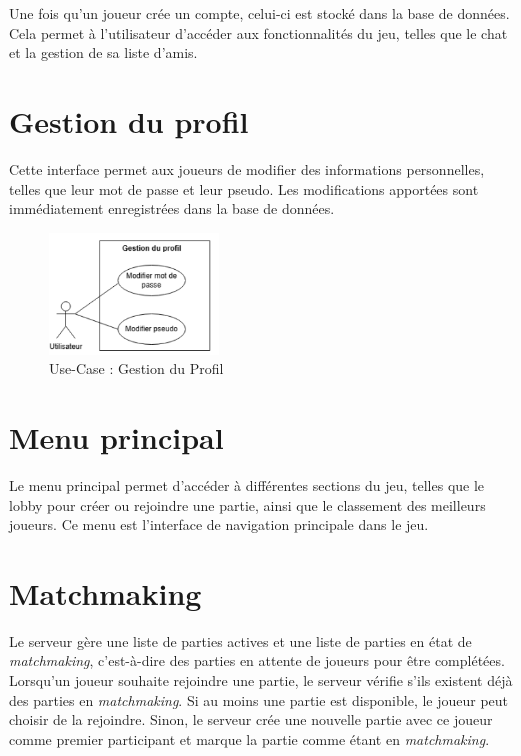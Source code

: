 \documentclass{report}
\begin{document}
\noindent Une fois qu’un joueur crée un compte, celui-ci est stocké dans la base de données. Cela permet à l'utilisateur d'accéder aux fonctionnalités du jeu, telles que le chat et la gestion de sa liste d'amis.


\section{Gestion du profil}

\noindent Cette interface permet aux joueurs de modifier des informations personnelles, telles que leur mot de passe et leur pseudo. Les modifications apportées sont immédiatement enregistrées dans la base de données.

\vspace{-1em}

\begin{figure}[H]
    \centering
     \includegraphics[width=0.4\textwidth, keepaspectratio]{src/design/user.png}
    \caption{Use-Case : Gestion du Profil}
    \label{fig:use_case_profil_managing_design}
\end{figure}

\section{Menu principal}

\noindent Le menu principal permet d'accéder à différentes sections du jeu, telles que le lobby pour créer ou rejoindre une partie, ainsi que le classement des meilleurs joueurs. Ce menu est l'interface de navigation principale dans le jeu.

\section{Matchmaking}

\noindent Le serveur gère une liste de parties actives et une liste de parties en état de \emph{matchmaking}, c’est-à-dire des parties en attente de joueurs pour être complétées. Lorsqu'un joueur souhaite rejoindre une partie, le serveur vérifie s'ils existent déjà des parties en \emph{matchmaking}. Si au moins une partie est disponible, le joueur peut choisir de la rejoindre. Sinon, le serveur crée une nouvelle partie avec ce joueur comme premier participant et marque la partie comme étant en \emph{matchmaking}.
\end{document}
